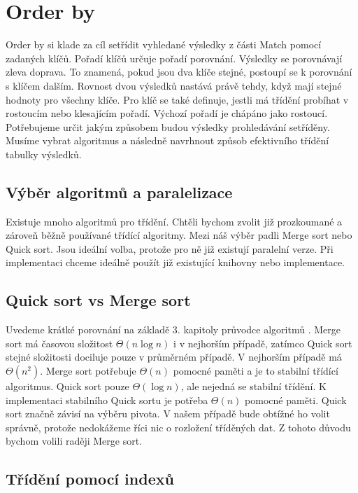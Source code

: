 \bigskip

\section{Order by} \label{anal.orderby}

Order by si klade za cíl setřídit vyhledané výsledky z části Match pomocí zadaných klíčů.
Pořadí klíčů určuje pořadí porovnání.
Výsledky se porovnávají zleva doprava.
To znamená, pokud jsou dva klíče stejné, postoupí se k porovnání s klíčem dalším.
Rovnost dvou výsledků nastává právě tehdy, když mají stejné hodnoty pro všechny klíče. 
Pro klíč se také definuje, jestli má třídění probíhat v rostoucím nebo klesajícím pořadí.
Výchozí pořadí je chápáno jako rostoucí. 
Potřebujeme určit jakým způsobem budou výsledky prohledávání setříděny.
Musíme vybrat algoritmus a následně navrhnout způsob efektivního třídění tabulky výsledků.

\subsection{Výběr algoritmů a paralelizace}

Existuje mnoho algoritmů pro třídění.
Chtěli bychom zvolit již prozkoumané a zároveň běžně používané třídící algoritmy.
Mezi náš výběr padli Merge sort nebo Quick sort.
Jsou ideální volba, protože pro ně již existují paralelní verze.
Při implementaci chceme ideálně použít již existující knihovny nebo implementace. 

\subsection{Quick sort vs Merge sort}

Uvedeme krátké porovnání na základě 3. kapitoly průvodce algoritmů \citep{labyrint}. 
Merge sort má časovou složitost $ \Theta(n\log n) $ i v nejhorším případě, zatímco Quick sort stejné složitosti dociluje pouze v průměrném případě.
V nejhorším případě má $\Theta(n^2)$.
Merge sort potřebuje $\Theta(n)$ pomocné paměti a je to stabilní třídící algoritmus.
Quick sort pouze $\Theta(\log n)$, ale nejedná se stabilní třídění.
K implementaci stabilního Quick sortu je potřeba $\Theta(n)$ pomocné paměti.
Quick sort značně závisí na výběru pivota.
V našem případě bude obtížné ho volit správně, protože nedokážeme říci nic o rozložení tříděných dat.
Z tohoto důvodu bychom volili raději Merge sort.  

\subsection{Třídění pomocí indexů}

